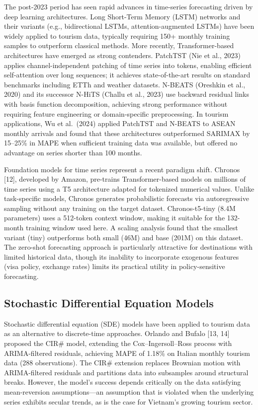 \documentclass[
]{article}
\begin{document}
The post-2023 period has seen rapid advances in time-series forecasting
driven by deep learning architectures. Long Short-Term Memory (LSTM)
networks and their variants (e.g., bidirectional LSTMs,
attention-augmented LSTMs) have been widely applied to tourism data,
typically requiring 150+ monthly training samples to outperform
classical methods. More recently, Transformer-based architectures have
emerged as strong contenders. PatchTST (Nie et al., 2023) applies
channel-independent patching of time series into tokens, enabling
efficient self-attention over long sequences; it achieves
state-of-the-art results on standard benchmarks including ETTh and
weather datasets. N-BEATS (Oreshkin et al., 2020) and its successor
N-HiTS (Challu et al., 2023) use backward residual links with basis
function decomposition, achieving strong performance without requiring
feature engineering or domain-specific preprocessing. In tourism
applications, Wu et al.~(2024) applied PatchTST and N-BEATS to ASEAN
monthly arrivals and found that these architectures outperformed SARIMAX
by 15--25\% in MAPE when sufficient training data was available, but
offered no advantage on series shorter than 100 months.

Foundation models for time series represent a recent paradigm shift.
Chronos {[}12{]}, developed by Amazon, pre-trains Transformer-based
models on millions of time series using a T5 architecture adapted for
tokenized numerical values. Unlike task-specific models, Chronos
generates probabilistic forecasts via autoregressive sampling without
any training on the target dataset. Chronos-t5-tiny (8.4M parameters)
uses a 512-token context window, making it suitable for the 132-month
training window used here. A scaling analysis found that the smallest
variant (tiny) outperforms both small (46M) and base (201M) on this
dataset. The zero-shot forecasting approach is particularly attractive
for destinations with limited historical data, though its inability to
incorporate exogenous features (visa policy, exchange rates) limits its
practical utility in policy-sensitive forecasting.

\subsection{Stochastic Differential Equation
Models}\label{stochastic-differential-equation-models}

Stochastic differential equation (SDE) models have been applied to
tourism data as an alternative to discrete-time approaches. Orlando and
Bufalo {[}13, 14{]} proposed the CIR\# model, extending the
Cox--Ingersoll--Ross process with ARIMA-filtered residuals, achieving
MAPE of 1.18\% on Italian monthly tourism data (288 observations). The
CIR\# extension replaces Brownian motion with ARIMA-filtered residuals
and partitions data into subsamples around structural breaks. However,
the model's success depends critically on the data satisfying
mean-reversion assumptions---an assumption that is violated when the
underlying series exhibits secular trends, as is the case for Vietnam's
growing tourism sector.
\end{document}
